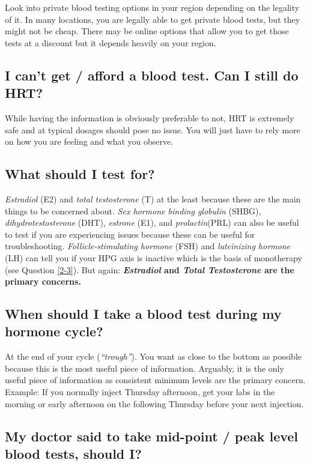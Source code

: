 \documentclass{article}
\begin{document}
Look into private blood testing options in your region depending on the legality of it. In many locations, you are legally able to get private blood tests, but they might not be cheap. There may be online options that allow you to get those tests at a discount but it depends heavily on your region.

\subsection{I can’t get / afford a blood test. Can I still do HRT?}

While having the information is obviously preferable to not, HRT is extremely safe and at typical dosages should pose no issue. You will just have to rely more on how you are feeling and what you observe.

\subsection{What should I test for?}

\textit{Estradiol} (E2) and \textit{total testosterone} (T) at the least because these are the main things to be concerned about. \textit{Sex hormone binding globulin} (SHBG), \textit{dihydrotestosterone} (DHT), \textit{estrone} (E1), and \textit{prolactin}(PRL) can also be useful to test if you are experiencing issues because these can be useful for troubleshooting. \textit{Follicle-stimulating hormone} (FSH) and \textit{luteinizing hormone} (LH) can tell you if your HPG axis is inactive which is the basis of monotherapy (see Question \ref{2-3}). But again: \textbf{\textit{Estradiol} and \textit{Total Testosterone} are the primary concerns.}

\subsection{When should I take a blood test during my hormone cycle?}

At the end of your cycle (\textit{“trough”}). You want as close to the bottom as possible because this is the most useful piece of information. Arguably, it is the only useful piece of information as consistent minimum levels are the primary concern. Example: If you normally inject Thursday afternoon, get your labs in the morning or early afternoon on the following Thursday before your next injection.

\subsection{My doctor said to take mid-point / peak level blood tests, should I?}
\end{document}
